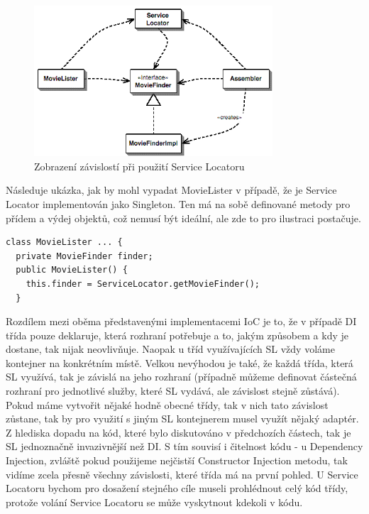 \documentclass[a4paper,conference]{IEEEtran}
\begin{document}
\begin{figure}[!ht]
\centering
\includegraphics[width=3.5in]{3-Locator}
\caption{Zobrazení závislostí při použití Service Locatoru}
\label{fig:locator}
\end{figure}

Následuje ukázka, jak by mohl vypadat MovieLister v případě, že je Service Locator implementován jako Singleton. Ten má na sobě definované metody pro přídem a výdej objektů, což nemusí být ideální, ale zde to pro ilustraci postačuje.

\lstset{language=Java, caption=MovieLister při použití Service Locatoru, label=listing:Java}
\begin{lstlisting}
class MovieLister ... { 
  private MovieFinder finder;
  public MovieLister() {
    this.finder = ServiceLocator.getMovieFinder();
  }
\end{lstlisting}

Rozdílem mezi oběma představenými implementacemi IoC je to, že v případě DI třída pouze deklaruje, která rozhraní potřebuje a to, jakým způsobem a kdy je dostane, tak nijak neovlivňuje. Naopak u tříd využívajících SL vždy voláme kontejner na konkrétním místě. Velkou nevýhodou je také, že každá třída, která SL využívá, tak je závislá na jeho rozhraní (případně můžeme definovat částečná rozhraní pro jednotlivé služby, které SL vydává, ale závislost stejně zůstává). Pokud máme vytvořit nějaké hodně obecné třídy, tak v nich tato závislost zůstane, tak by pro využití s jiným SL kontejnerem musel využít nějaký adaptér. Z hlediska dopadu na kód, které bylo diskutováno v předchozích částech, tak je SL jednoznačně invazivnější než DI. S tím souvisí i čitelnost kódu - u Dependency Injection, zvláště pokud použijeme nejčistší Constructor Injection metodu, tak vidíme zcela přesně všechny závislosti, které třída má na první pohled. U Service Locatoru bychom pro dosažení stejného cíle museli prohlédnout celý kód třídy, protože volání Service Locatoru se může vyskytnout kdekoli v kódu.
\end{document}
